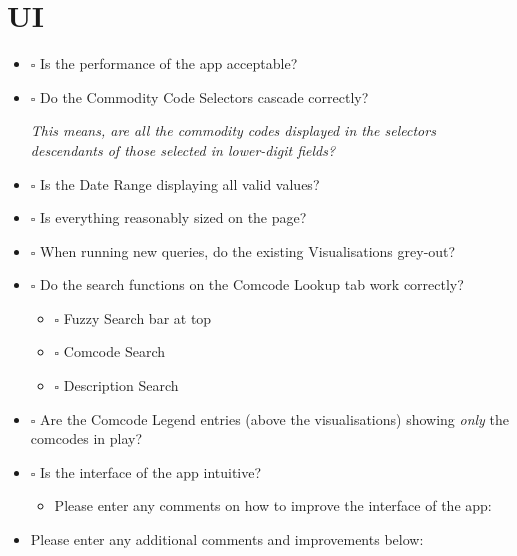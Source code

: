 \documentclass[11pt]{article}
\begin{document}
\section{UI}
\label{sec-3}
\begin{itemize}
\item $\square$ Is the performance of the app acceptable?
\item $\square$ Do the Commodity Code Selectors cascade correctly?

\emph{This means, are all the commodity codes displayed in the selectors descendants of those selected in lower-digit fields?}

\item $\square$ Is the Date Range displaying all valid values?
\item $\square$ Is everything reasonably sized on the page?
\item $\square$ When running new queries, do the existing Visualisations grey-out?
\item $\square$ Do the search functions on the Comcode Lookup tab work correctly?
\begin{itemize}
\item $\square$ Fuzzy Search bar at top
\item $\square$ Comcode Search
\item $\square$ Description Search
\end{itemize}
\item $\square$ Are the Comcode Legend entries (above the visualisations) showing \emph{only} the comcodes in play?
\item $\square$ Is the interface of the app intuitive?
\begin{itemize}
\item Please enter any comments on how to improve the interface of the app:
\end{itemize}
\end{itemize}

\vspace*{6cm}

\begin{itemize}
\item Please enter any additional comments and improvements below:
\end{itemize}
\end{document}
